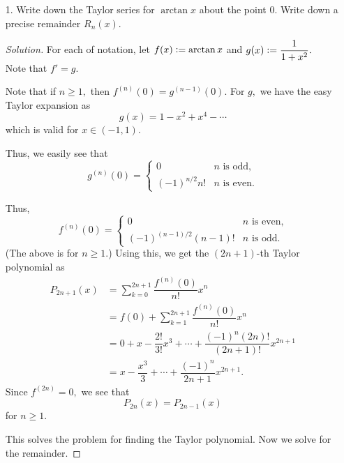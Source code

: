 \documentclass[12pt]{article}
\theoremstyle{definition}
\newenvironment{soln}{\begin{proof}[Solution]}{\end{proof}}
\begin{document}
\begin{itemize}
	\item[1.] Write down the Taylor series for $\arctan x$ about the point $0.$ Write down a precise remainder $R_n(x).$
	\begin{soln}
		For each of notation, let $f(x) \vcentcolon= \arctan x$ and $g(x) \vcentcolon= \dfrac{1}{1 + x^2}.$\\
		Note that $f' = g.$

		Note that if $n \ge 1,$ then $f^{(n)}(0) = g^{(n - 1)}(0).$ For $g,$ we have the easy Taylor expansion as
		\begin{equation*} 
			g(x) = 1 - x^2 + x^4 - \cdots
		\end{equation*}
		which is valid for $x \in (-1, 1).$

		Thus, we easily see that
		\begin{equation*} 
			g^{(n)}(0) = \begin{cases}
				0 & n \text{ is odd,}\\
				(-1)^{n/2}n! & n \text{ is even.}
			\end{cases}
		\end{equation*}

		Thus,
		\begin{equation*} 
			f^{(n)}(0) = \begin{cases}
				0 & n \text{ is even,}\\
				(-1)^{(n - 1)/2}(n - 1)! & n \text{ is odd.}
			\end{cases}
		\end{equation*}
		(The above is for $n \ge 1.$)
		Using this, we get the $(2n + 1)$-th Taylor polynomial as
		\begin{align*} 
			P_{2n + 1}(x) &= \sum_{k = 0}^{2n + 1}\dfrac{f^{(n)}(0)}{n!}x^n\\
			&= f(0) + \sum_{k = 1}^{2n + 1}\dfrac{f^{(n)}(0)}{n!}x^n\\
			&= 0 + x - \dfrac{2!}{3!}x^3 + \cdots + \dfrac{(-1)^n(2n)!}{(2n + 1)!}x^{2n + 1}\\
			&= x - \dfrac{x^3}{3} + \cdots + \dfrac{(-1)^n}{2n + 1}x^{2n + 1}.
		\end{align*}
		Since $f^{(2n)} = 0,$ we see that
		\begin{equation*} 
			P_{2n}(x) = P_{2n - 1}(x)
		\end{equation*}
		for $n \ge 1.$

		This solves the problem for finding the Taylor polynomial. Now we solve for the remainder.


\end{soln}
\end{itemize}
\end{document}
